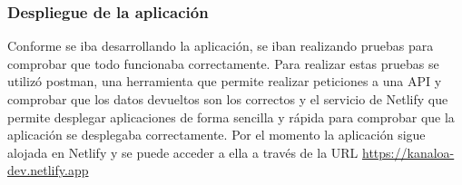 \subsubsection{Despliegue de la aplicación}
\label{sec:despliegue-aplicacion}

Conforme se iba desarrollando la aplicación, se iban realizando pruebas para comprobar que todo funcionaba correctamente.
Para realizar estas pruebas se utilizó postman, una herramienta que permite realizar peticiones a una API y comprobar que los
datos devueltos son los correctos y el servicio de Netlify \cite{netlify} que permite desplegar aplicaciones de forma sencilla y rápida
para comprobar que la aplicación se desplegaba correctamente. Por el momento la aplicación sigue alojada en Netlify y se puede
acceder a ella a través de la URL \url{https://kanaloa-dev.netlify.app}